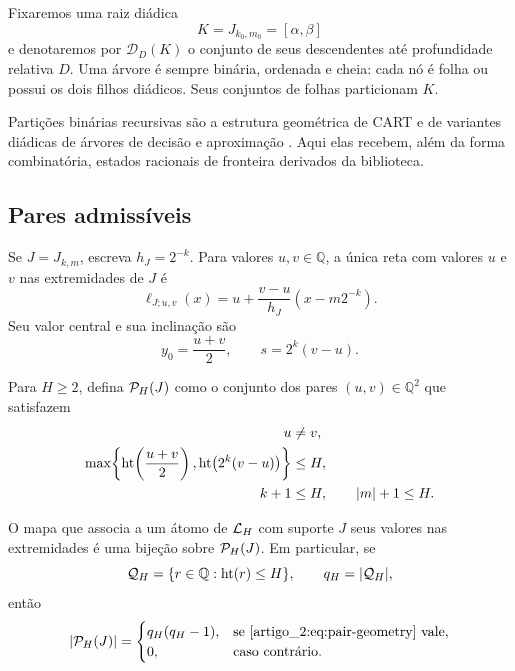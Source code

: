 Fixaremos uma raiz diádica
\[
 K=J_{k_0,m_0}=[\alpha,\beta]
\]
e denotaremos por $\mathcal D_D(K)$ o conjunto de seus descendentes até
profundidade relativa $D$. Uma árvore é sempre binária, ordenada e cheia:
cada nó é folha ou possui os dois filhos diádicos. Seus conjuntos de folhas
particionam $K$.

Partições binárias recursivas são a estrutura geométrica de CART e de variantes
diádicas de árvores de decisão e aproximação
\citep{artigo_2-breiman1984,artigo_2-donoho1997,artigo_2-blanchard2007}. Aqui elas recebem, além da forma
combinatória, estados racionais de fronteira derivados da biblioteca.

\subsection{Pares admissíveis}

Se $J=J_{k,m}$, escreva $h_J=2^{-k}$. Para valores $u,v\in\mathbb Q$, a única
reta com valores $u$ e $v$ nas extremidades de $J$ é
\begin{equation}
 \ell_{J;u,v}(x)
 =u+\frac{v-u}{h_J}(x-m2^{-k}).
 \label{artigo_2:eq:endpoint-line}
\end{equation}
Seu valor central e sua inclinação são
\[
 y_0=\frac{u+v}{2},
 \qquad s=2^k(v-u).
\]

\begin{definition}\label{map:artigo_2:4.1}
\label{artigo_2:def:admissible-pairs}
Para $H\ge2$, defina $\mathcal{P}_H(J)$ como o conjunto dos pares
$(u,v)\in\mathbb Q^2$ que satisfazem
\begin{align}
 u&\ne v,\label{artigo_2:eq:pair-nonzero}\\
 \max\!\left\{\operatorname{ht}\!\left(\frac{u+v}{2}\right),
 \operatorname{ht}\!\left(2^k(v-u)\right)\right\}&\le H,\label{artigo_2:eq:pair-arithmetic}\\
 k+1&\le H,\qquad |m|+1\le H.\label{artigo_2:eq:pair-geometry}
\end{align}
\end{definition}

\begin{proposition}\label{map:artigo_2:4.2}
\label{artigo_2:prop:endpoint-dictionary}
O mapa que associa a um átomo de $\mathcal{L}_H$ com suporte $J$ seus valores
nas extremidades é uma bijeção sobre $\mathcal{P}_H(J)$. Em particular, se
\[
 \mathcal Q_H=\{r\in\mathbb Q:\operatorname{ht}(r)\le H\},
 \qquad q_H=|\mathcal Q_H|,
\]
então
\begin{equation}
 |\mathcal{P}_H(J)|=
 \begin{cases}
 q_H(q_H-1),&\text{se \eqref{artigo_2:eq:pair-geometry} vale},\\
 0,&\text{caso contrário}.
 \end{cases}
 \label{artigo_2:eq:pair-count}
\end{equation}
\end{proposition}

